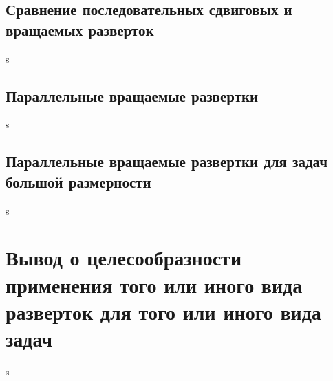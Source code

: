 \documentclass[runningheads]{llncs}
\begin{document}
\subsection{Сравнение последовательных сдвиговых и вращаемых разверток}
s
\subsection{Параллельные вращаемые развертки}
s
\subsection{Параллельные вращаемые развертки для задач большой размерности}
s
\section{Вывод о целесообразности применения того или иного вида разверток для того или иного вида задач}
s
\end{document}
